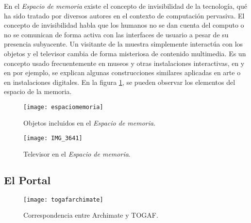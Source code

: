 En el \textit{Espacio de memoria} existe el concepto de invisibilidad de la tecnología\cite{RN13,weiser1991computer,RN23,RN14}, qué ha sido tratado por diversos autores en el contexto de computación pervasiva. El concepto de invisibilidad habla que los humanos no se dan cuenta del computo o no se comunican de forma activa con las interfaces de usuario a pesar de su presencia subyacente. Un visitante de la muestra simplemente interactúa con los objetos y el televisor cambia de forma misteriosa de contenido multimedia. Es un concepto usado frecuentemente en museos y otras instalaciones interactivas, en \cite{RN31} y en \cite{RN34} por ejemplo, se explican algunas construcciones similares aplicadas en arte o en instalaciones digitales. En la figura \ref{espaciomemoriaimg}, se pueden observar los elementos del espacio de la memoria.

\begin{figure}[h]
\label{espaciomemoriaimg}
\centering
\texttt{[image: espaciomemoria]}
\caption{Objetos incluidos en el \textit{Espacio de memoria}.}
\end{figure}

\begin{figure}[h]
\label{televisorimg}
\centering
\texttt{[image: IMG\_3641]}
\caption{Televisor en el \textit{Espacio de memoria}.}
\end{figure}


\subsection{El Portal}

\begin{figure}[h]\label{togafarchimate}
\centering
\texttt{[image: togafarchimate]}
\caption{Correspondencia entre Archimate y TOGAF.}
\end{figure}
